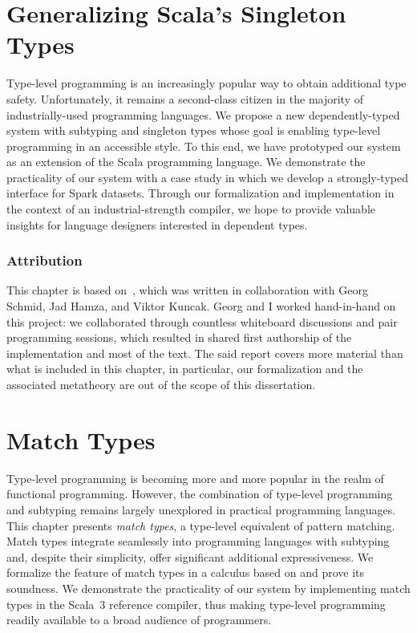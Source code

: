 \chapter{Generalizing Scala's Singleton Types}
\label{chap:generalizing-singleton-types}

Type-level programming is an increasingly popular way to obtain additional type safety.
Unfortunately, it remains a second-class citizen in the majority of industrially-used programming languages.
We propose a new dependently-typed system with subtyping and singleton types whose goal is enabling type-level programming in an accessible style.
To this end, we have prototyped our system as an extension of the Scala programming language.
We demonstrate the practicality of our system with a case study in which we develop a strongly-typed interface for Spark datasets.
Through our formalization and implementation in the context of an industrial-strength compiler, we hope to provide valuable insights for language designers interested in dependent types.

\subsection*{Attribution}

This chapter is based on~\citep{schmid2020coming}, which was written in collaboration with Georg Schmid, Jad Hamza, and Viktor Kuncak.
Georg and I worked hand-in-hand on this project: we collaborated through countless whiteboard discussions and pair programming sessions, which resulted in shared first authorship of the implementation and most of the text.
The said report covers more material than what is included in this chapter, in particular, our formalization and the associated metatheory are out of the scope of this dissertation.



\chapter{Match Types}
\label{chap:match-types}

Type-level programming is becoming more and more popular in the realm of functional programming.
However, the combination of type-level programming and subtyping remains largely unexplored in practical programming languages.
This chapter presents \emph{match types}, a type-level equivalent of pattern matching.
Match types integrate seamlessly into programming languages with subtyping and, despite their simplicity, offer significant additional expressiveness.
We formalize the feature of match types in a calculus based on \SystemFsub and prove its soundness.
We demonstrate the practicality of our system by implementing match types in the Scala~3 reference compiler, thus making type-level programming readily available to a broad audience of programmers.

